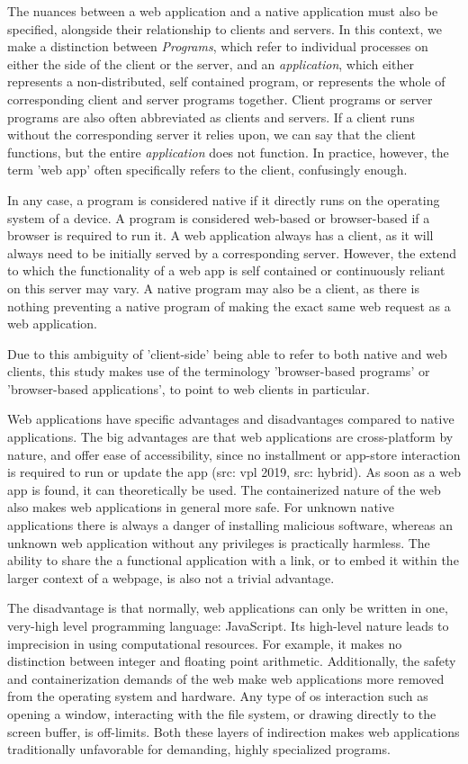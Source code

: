 The nuances between a web application and a native application must also be specified, alongside their relationship to clients and servers. 
In this context, we make a distinction between \emph{Programs}, which refer to individual processes on either the side of the client or the server, and an \emph{application}, which either represents a non-distributed, self contained program, or represents the whole of corresponding client and server programs together.
Client programs or server programs are also often abbreviated as clients and servers.  
If a client runs without the corresponding server it relies upon, we can say that the client functions, but the entire \emph{application} does not function. 
In practice, however, the term 'web app' often specifically refers to the client, confusingly enough.

In any case, a program is considered native if it directly runs on the operating system of a device.
A program is considered web-based or browser-based if a browser is required to run it. 
A web application always has a client, as it will always need to be initially served by a corresponding server.
However, the extend to which the functionality of a web app is self contained or continuously reliant on this server may vary.
A native program may also be a client, as there is nothing preventing a native program of making the exact same web request as a web application. 

Due to this ambiguity of 'client-side' being able to refer to both native and web clients, this study makes use of the terminology 'browser-based programs' or 'browser-based applications', to point to web clients in particular. 

Web applications have specific advantages and disadvantages compared to native applications. 
The big advantages are that web applications are cross-platform by nature, and offer ease of accessibility, since no installment or app-store interaction is required to run or update the app (src: vpl 2019, src: hybrid).
As soon as a web app is found, it can theoretically be used.
The containerized nature of the web also makes web applications in general more safe. 
For unknown native applications there is always a danger of installing malicious software, whereas an unknown web application without any privileges is practically harmless. 
The ability to share the a functional application with a link, or to embed it within the larger context of a webpage, is also not a trivial advantage.

The disadvantage is that normally, web applications can only be written in one, very-high level programming language: JavaScript. 
Its high-level nature leads to imprecision in using computational resources. 
For example, it makes no distinction between integer and floating point arithmetic.  
Additionally, the safety and containerization demands of the web make web applications more removed from the operating system and hardware.
Any type of \ac{os} interaction such as opening a window, interacting with the file system, or drawing directly to the screen buffer, is off-limits.  
Both these layers of indirection makes web applications traditionally unfavorable for demanding, highly specialized programs. 

